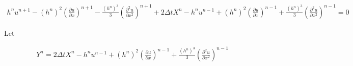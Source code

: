 \documentclass[SingleSpace,12pt,Proceedings]{Serre_ASCE}
\begin{document}
\begin{linenomath*}
\begin{gather}
h^{n}u^{n+1} - \left(h^{n}\right)^2 \left(\frac{\partial u}{\partial x}\right)^{n+1} - \frac{\left(h^{n}\right)^3}{3}\left(\frac{\partial^2 u}{\partial x^2}\right)^{n+1}  + 2\Delta tX^{n} - h^{n}u^{n-1} + \left(h^{n}\right)^2\left(\frac{\partial u}{\partial x}\right)^{n-1} + \frac{\left(h^{n}\right)^3}{3}\left(\frac{\partial^2 u}{\partial x^2}\right)^{n-1}   =0 
\label{eq:expandedutdisc2}
\end{gather}
\end{linenomath*}
Let
\begin{linenomath*}
\begin{gather}
Y^n = 2\Delta tX^{n} - h^{n}u^{n-1} + \left(h^{n}\right)^2\left(\frac{\partial u}{\partial x}\right)^{n-1} + \frac{\left(h^{n}\right)^3}{3}\left(\frac{\partial^2 u}{\partial x^2}\right)^{n-1}
\label{eq:expandfactor Xp}
\end{gather}
\end{linenomath*}
\end{document}
